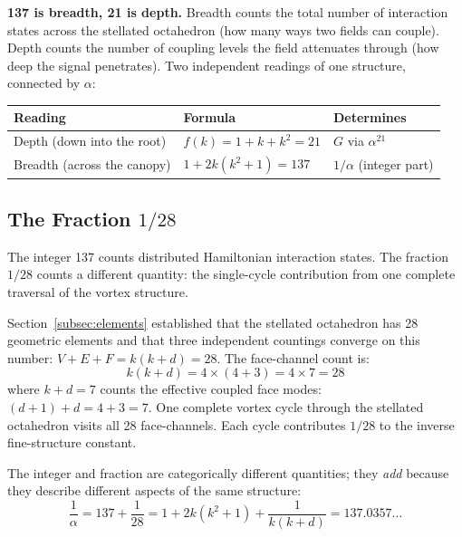 \documentclass[aps,prd,preprint,superscriptaddress,showpacs,preprintnumbers,amsmath,amssymb,nofootinbib]{revtex4-2}
\begin{document}
\textbf{137 is breadth, 21 is depth.} Breadth counts the total number of interaction states across the stellated octahedron (how many ways two fields can couple). Depth counts the number of coupling levels the field attenuates through (how deep the signal penetrates). Two independent readings of one structure, connected by $\alpha$:

\begin{center}
\renewcommand{\arraystretch}{1.4}
\begin{tabular*}{0.9\textwidth}{@{\extracolsep{\fill}} lll @{}}
\toprule
\textbf{Reading} & \textbf{Formula} & \textbf{Determines} \\
\midrule
Depth (down into the root) & $f(k) = 1 + k + k^2 = 21$ & $G$ via $\alpha^{21}$ \\
Breadth (across the canopy) & $1 + 2k(k^2 + 1) = 137$ & $1/\alpha$ (integer part) \\
\bottomrule
\end{tabular*}
\end{center}

\subsection{The Fraction $1/28$}
\label{subsec:fraction}

The integer 137 counts distributed Hamiltonian interaction states. The fraction $1/28$ counts a different quantity: the single-cycle contribution from one complete traversal of the vortex structure.

Section~\ref{subsec:elements} established that the stellated octahedron has 28 geometric elements and that three independent countings converge on this number: $V + E + F = k(k+d) = 28$. The face-channel count is:
\begin{equation}
k(k + d) = 4 \times (4 + 3) = 4 \times 7 = 28
\end{equation}
where $k + d = 7$ counts the effective coupled face modes: $(d+1) + d = 4 + 3 = 7$. One complete vortex cycle through the stellated octahedron visits all 28 face-channels. Each cycle contributes $1/28$ to the inverse fine-structure constant.

The integer and fraction are categorically different quantities; they \emph{add} because they describe different aspects of the same structure:
\begin{equation}
\frac{1}{\alpha} = 137 + \frac{1}{28} = 1 + 2k(k^2 + 1) + \frac{1}{k(k+d)} = 137.0357\ldots
\label{eq:alpha-full}
\end{equation}
\end{document}
